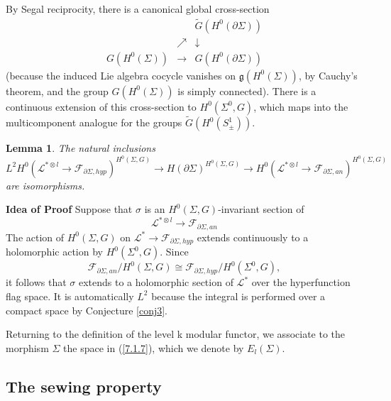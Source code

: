 \documentclass{amsart}
\newtheorem{lemma}{Lemma}
\theoremstyle{conjecture}
\theoremstyle{definition}
\theoremstyle{question}
\theoremstyle{questions}
\theoremstyle{remark}
\theoremstyle{remarks}
\theoremstyle{example}
\numberwithin{equation}{section}
\begin{document}
By Segal reciprocity, there is a canonical global
cross-section
\begin{equation}\begin{matrix} \quad&\quad&\tilde {G}(H^0(\partial\Sigma ))\\
\quad&\nearrow&\downarrow\\
G(H^0(\Sigma ))&\rightarrow&G(H^0(\partial\Sigma ))\end{matrix}  \label{7.1.9}\end{equation}
(because the induced Lie algebra cocycle vanishes on
$\mathfrak g(H^0(\Sigma ))$, by Cauchy's theorem, and the group $G
(H^0(\Sigma ))$ is
simply connected).  There is a continuous extension of
this cross-section to $H^0(\Sigma^0,G)$, which maps into the
multicomponent analogue for the groups $\tilde {G}(H^0(S^1_{\pm}
))$.

\begin{lemma}\label{7.1.10} The natural inclusions
$$L^2H^0(\mathcal L^{*\otimes l}\to \mathcal F_{\partial\Sigma ,hyp})^{H^0(\Sigma
,G)}\to H(\partial\Sigma )^{H^0(\Sigma ,G)}\to H^0(\mathcal L^{
*\otimes l}\to \mathcal F_{\partial\Sigma ,an})^{H^0(\Sigma ,G)}$$
are
isomorphisms.\end{lemma}

{\bf Idea of Proof} Suppose that $\sigma$ is an $H^0(\Sigma ,G)$-invariant
section of
\begin{equation}\mathcal L^{*\otimes l}\to \mathcal F_{\partial\Sigma ,an} \label{7.1.11}\end{equation}
The action of $H^0(\Sigma ,G)$ on $\mathcal L^{*}\to \mathcal F_{\partial
\Sigma ,hyp}$ extends continuously
to a holomorphic action by $H^0(\Sigma^0,G)$.  Since
\begin{equation}\mathcal F_{\partial\Sigma ,an}/H^0(\Sigma ,G)\cong \mathcal F_{\partial
\Sigma ,hyp}/H^0(\Sigma^0,G), \label{7.1.12}\end{equation}
it follows that $\sigma$ extends to a holomorphic section of $\mathcal L^{
*}$
over the hyperfunction flag space.  It is automatically
$L^2$ because the integral is performed over a compact
space by Conjecture \ref{conj3}.

Returning to the definition of the level k modular
functor, we associate to the morphism $\Sigma$ the space in
(\ref{7.1.7}), which we denote by $E_l(\Sigma )$.



\subsection{The sewing property}
\end{document}
